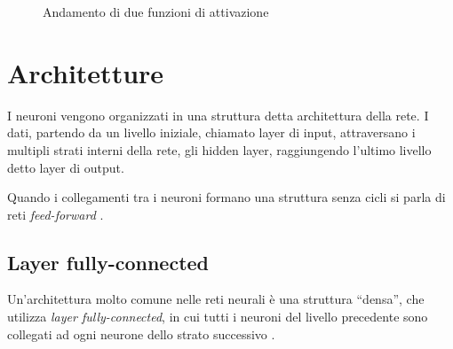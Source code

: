 \begin{figure}[htb]
	\centering
	\quad
	
	\caption{Andamento di due funzioni di attivazione}
	\label{fig:subfig}
\end{figure}

\section{Architetture}
\label{sec:architetture}

I neuroni vengono organizzati in una struttura detta architettura della rete.
I dati, partendo da un livello iniziale, chiamato layer di input, attraversano i multipli strati interni della rete, gli hidden layer, raggiungendo l'ultimo livello detto layer di output.

Quando i collegamenti tra i neuroni formano una struttura senza cicli si parla di reti \emph{feed-forward} \cite{svozil1997introduction}.

\subsection{Layer fully-connected}
\label{subsec:fc}

Un’architettura molto comune nelle reti neurali è una struttura ``densa'', che utilizza \emph{layer fully-connected}, in cui tutti i neuroni del livello precedente sono collegati ad ogni neurone dello strato successivo \cite{sainath2015convolutional}.

